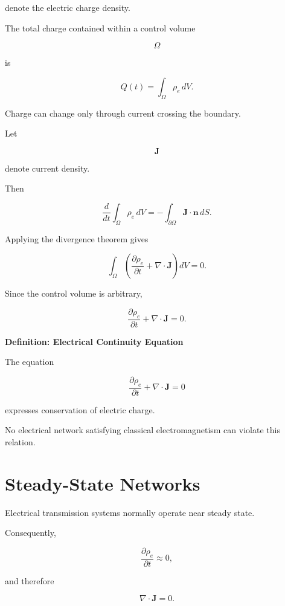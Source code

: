 \documentclass[11pt,fleqn]{book}
\numberwithin{equation}{chapter}
\newenvironment{definition}[1]
  {\begin{definitionEnv}
   \noindent\textbf{Definition: #1}\par\smallskip}
  {\end{definitionEnv}}
\theoremstyle{plain}
\theoremstyle{definition}
\theoremstyle{remark}
\begin{document}
denote the electric charge density.

The total charge contained within a control volume

\[
\Omega
\]

is

\[
Q(t)
=
\int_\Omega
\rho_e\,dV.
\]

Charge can change only through current crossing the boundary.

Let

\[
\mathbf J
\]

denote current density.

Then

\[
\frac{d}{dt}
\int_\Omega
\rho_e\,dV
=
-
\int_{\partial\Omega}
\mathbf J\cdot\mathbf n\,dS.
\]

Applying the divergence theorem gives

\[
\int_\Omega
\left(
\frac{\partial\rho_e}{\partial t}
+
\nabla\cdot\mathbf J
\right)
dV
=
0.
\]

Since the control volume is arbitrary,

\[
\boxed{
\frac{\partial\rho_e}{\partial t}
+
\nabla\cdot\mathbf J
=
0.
}
\]


\begin{definition}{Electrical Continuity Equation}

The equation

\[
\frac{\partial\rho_e}{\partial t}
+
\nabla\cdot\mathbf J
=
0
\]

expresses conservation of electric charge.

No electrical network satisfying classical electromagnetism can violate
this relation.

\end{definition}


\section{Steady-State Networks}

Electrical transmission systems normally operate near steady state.

Consequently,

\[
\frac{\partial\rho_e}{\partial t}
\approx0,
\]

and therefore

\[
\nabla\cdot\mathbf J
=
0.
\]
\end{document}
